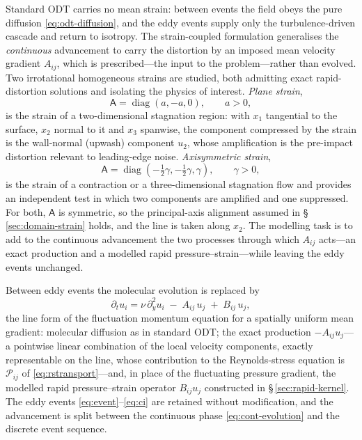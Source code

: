 \documentclass[lineno]{JFM-FLM_Au}
\begin{document}
Standard ODT carries no mean strain: between events the field obeys the
pure diffusion \eqref{eq:odt-diffusion}, and the eddy events supply only
the turbulence-driven cascade and return to isotropy. The strain-coupled
formulation generalises the \emph{continuous} advancement to carry the
distortion by an imposed mean velocity gradient $A_{ij}$, which is
prescribed---the input to the problem---rather than evolved. Two
irrotational homogeneous strains are studied, both admitting exact
rapid-distortion solutions and isolating the physics of interest.
\emph{Plane strain},
\begin{equation}
  \mathsf{A}=\operatorname{diag}(a,-a,0),\qquad a>0,
  \label{eq:plane-strain}
\end{equation}
is the strain of a two-dimensional stagnation region: with $x_1$
tangential to the surface, $x_2$ normal to it and $x_3$ spanwise, the
component compressed by the strain is the wall-normal (upwash) component
$u_2$, whose amplification is the pre-impact distortion relevant to
leading-edge noise. \emph{Axisymmetric strain},
\begin{equation}
  \mathsf{A}=\operatorname{diag}(-\tfrac12\gamma,-\tfrac12\gamma,\gamma),
  \qquad \gamma>0,
  \label{eq:axi-strain}
\end{equation}
is the strain of a contraction or a three-dimensional stagnation flow and
provides an independent test in which two components are amplified and
one suppressed. For both, $\mathsf{A}$ is symmetric, so the
principal-axis alignment assumed in \S\,\ref{sec:domain-strain} holds,
and the line is taken along $x_2$. The modelling task is to add to the
continuous advancement the two processes through which $A_{ij}$
acts---an exact production and a modelled rapid pressure--strain---while
leaving the eddy events unchanged.

Between eddy events the molecular evolution is replaced by
\begin{equation}
  \partial_t u_i
  = \nu\,\partial_y^2 u_i \;-\; A_{ij}\,u_j \;+\; B_{ij}\,u_j,
  \label{eq:cont-evolution}
\end{equation}
the line form of the fluctuation momentum equation for a spatially
uniform mean gradient: molecular diffusion as in standard ODT; the
exact production $-A_{ij}u_j$---a pointwise linear combination of the
local velocity components, exactly representable on the line, whose
contribution to the Reynolds-stress equation is $\mathcal{P}_{ij}$ of
\eqref{eq:rstransport}---and, in place of the fluctuating pressure
gradient, the modelled rapid pressure--strain operator $B_{ij}u_j$
constructed in \S\,\ref{sec:rapid-kernel}. The
eddy events \eqref{eq:event}--\eqref{eq:ci} are retained without
modification, and the advancement is split between the continuous phase
\eqref{eq:cont-evolution} and the discrete event sequence.
\end{document}
